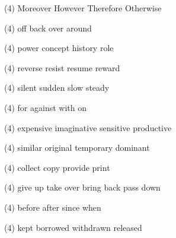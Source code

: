 \item
\begin{tasks}(4)
	\task Moreover
	\task However
	\task Therefore
	\task Otherwise
\end{tasks}
\item
\begin{tasks}(4)
	\task off
	\task back
	\task over
	\task around
\end{tasks}
\item
\begin{tasks}(4)
	\task power
	\task concept
	\task history
	\task role
\end{tasks}
\item
\begin{tasks}(4)
	\task reverse
	\task resist
	\task resume
	\task reward
\end{tasks}
\item
\begin{tasks}(4)
	\task silent
	\task sudden
	\task slow
	\task steady
\end{tasks}
\item
\begin{tasks}(4)
	\task for
	\task against
	\task with
	\task on
\end{tasks}
\item
\begin{tasks}(4)
	\task expensive
	\task imaginative
	\task sensitive
	\task productive
\end{tasks}
\item
\begin{tasks}(4)
	\task similar
	\task original
	\task temporary
	\task dominant
\end{tasks}
\item
\begin{tasks}(4)
	\task collect
	\task copy
	\task provide
	\task print
\end{tasks}
\item
\begin{tasks}(4)
	\task give up
	\task take over
	\task bring back
	\task pass down
\end{tasks}
\item
\begin{tasks}(4)
	\task before
	\task after
	\task since
	\task when
\end{tasks}
\item
\begin{tasks}(4)
	\task kept
	\task borrowed
	\task withdrawn
	\task released
\end{tasks}
\item
